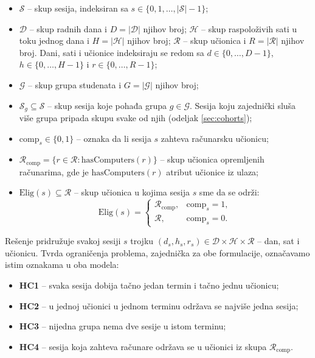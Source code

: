 \documentclass[12pt,oneside]{memoir}
\begin{document}
\begin{itemize}
\item $\mathcal{S}$ -- skup sesija, indeksiran sa
  $s \in \{0, 1, \ldots, |\mathcal{S}|-1\}$;
\item $\mathcal{D}$ -- skup radnih dana i $D = |\mathcal{D}|$ njihov
  broj; $\mathcal{H}$ -- skup raspoloživih sati u toku jednog dana i
  $H = |\mathcal{H}|$ njihov broj; $\mathcal{R}$ -- skup učionica i
  $R = |\mathcal{R}|$ njihov broj. Dani, sati i učionice indeksiraju se
  redom sa $d \in \{0, \ldots, D-1\}$, $h \in \{0, \ldots, H-1\}$ i
  $r \in \{0, \ldots, R-1\}$;
\item $\mathcal{G}$ -- skup grupa studenata i $G = |\mathcal{G}|$
  njihov broj;
\item $\mathcal{S}_g \subseteq \mathcal{S}$ -- skup sesija koje pohađa
  grupa $g \in \mathcal{G}$. Sesija koju zajednički sluša više grupa
  pripada skupu svake od njih (odeljak \ref{sec:cohorts});
\item $\text{comp}_s \in \{0,1\}$ -- oznaka da li sesija $s$ zahteva
  računarsku učionicu;
\item $\mathcal{R}_{\text{comp}} = \{r \in \mathcal{R} :
  \text{hasComputers}(r)\}$ -- skup učionica opremljenih računarima,
  gde je $\text{hasComputers}(r)$ atribut učionice iz ulaza;
\item $\text{Elig}(s) \subseteq \mathcal{R}$ -- skup učionica u kojima
  sesija $s$ sme da se održi:
  \[
    \text{Elig}(s) =
    \begin{cases}
      \mathcal{R}_{\text{comp}}, & \text{comp}_s = 1,\\
      \mathcal{R}, & \text{comp}_s = 0.
    \end{cases}
  \]
\end{itemize}

Rešenje pridružuje svakoj sesiji $s$ trojku $(d_s, h_s, r_s) \in
\mathcal{D} \times \mathcal{H} \times \mathcal{R}$ -- dan, sat i
učionicu. Tvrda ograničenja problema, zajednička za obe formulacije,
označavamo istim oznakama u oba modela:

\begin{itemize}
\item \textbf{HC1} -- svaka sesija dobija tačno jedan termin i tačno
  jednu učionicu;
\item \textbf{HC2} -- u jednoj učionici u jednom terminu održava se
  najviše jedna sesija;
\item \textbf{HC3} -- nijedna grupa nema dve sesije u istom terminu;
\item \textbf{HC4} -- sesija koja zahteva računare održava se u
  učionici iz skupa $\mathcal{R}_{\text{comp}}$.
\end{itemize}
\end{document}
